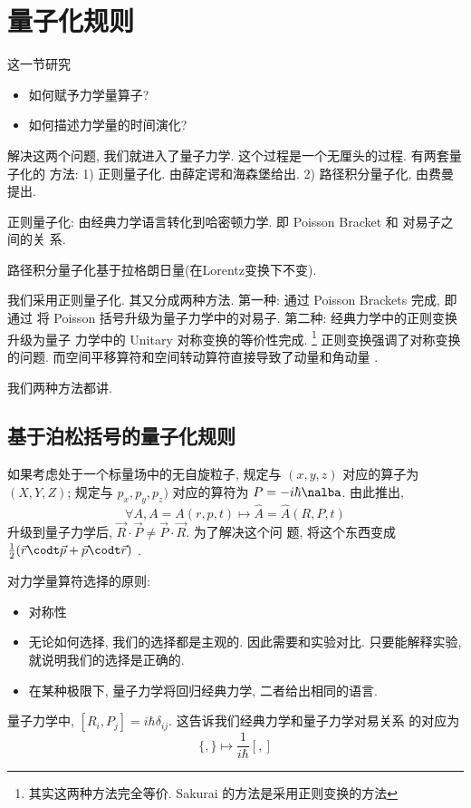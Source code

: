 \documentclass{ctexart}
\begin{document}
\section{量子化规则}

这一节研究
\begin{itemize} 
    \item 如何赋予力学量算子? 
    \item 如何描述力学量的时间演化? 
\end{itemize}
解决这两个问题, 我们就进入了量子力学. 这个过程是一个无厘头的过程. 有两套量子化的
方法: 1) 正则量子化. 由薛定谔和海森堡给出. 2) 路径积分量子化, 由费曼提出. 

正则量子化: 由经典力学语言转化到哈密顿力学. 即 Poisson Bracket 和 对易子之间的关
系. 

路径积分量子化基于拉格朗日量(在Lorentz变换下不变). 

我们采用正则量子化. 其又分成两种方法. 第一种: 通过 Poisson Brackets 完成, 即通过
将 Poisson 括号升级为量子力学中的对易子. 第二种: 经典力学中的正则变换升级为量子
力学中的 Unitary 对称变换的等价性完成. 
\footnote{其实这两种方法完全等价. Sakurai 的方法是采用正则变换的方法}
正则变换强调了对称变换的问题. 而空间平移算符和空间转动算符直接导致了动量和角动量
. 

我们两种方法都讲. 

\subsection{基于泊松括号的量子化规则} 

如果考虑处于一个标量场中的无自旋粒子, 规定与 $(x,y,z)$ 对应的算子为 $(X, Y, Z)$;
规定与 $p_x,p_y,p_z)$ 对应的算符为 $P=-i\hbar \nalba$. 由此推出, 
\[
\forall A, A=A(r,p,t) \mapsto \hat{A} = \hat{A}(R,P,t)
\]
升级到量子力学后, $\vec{R}\cdot \vec{P}\ne \vec{P}\cdot \vec{R}$. 为了解决这个问
题, 将这个东西变成 $\frac{1}{2} (\vec{r}\codt \vec{p} + \vec{p}\codt \vec{r})$ . 

对力学量算符选择的原则:
\begin{itemize} 
    \item 对称性
    \item 无论如何选择, 我们的选择都是主观的. 因此需要和实验对比. 只要能解释实验,
	就说明我们的选择是正确的. 
    \item 在某种极限下, 量子力学将回归经典力学, 二者给出相同的语言. 
\end{itemize}

量子力学中, $[R_i,P_j]=i\hbar\delta_{ij}$. 这告诉我们经典力学和量子力学对易关系
的对应为 
\[
    \{,\} \mapsto \frac{1}{i\hbar }[,]
\]
\end{document}
